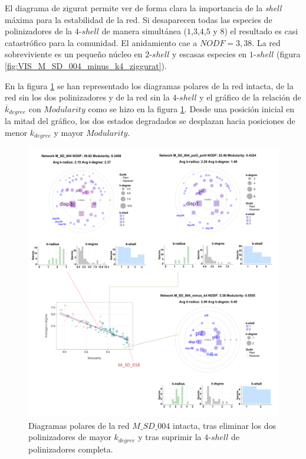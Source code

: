 El diagrama de zigurat permite ver de forma clara la importancia de la \textit{shell} máxima para la estabilidad de la red. Si desaparecen todas las especies de polinizadores de la $4$-$shell$ de manera simultánea ($1$,$3$,$4$,$5$ y $8$) el resultado es casi catastrófico para la comunidad. El anidamiento cae a $NODF = 3,38$. La red sobreviviente es un pequeño núcleo en $2$-$shell$ y escasas especies en $1$-$shell$ (figura \ref{fig:VIS_M_SD_004_minus_k4_ziggurat}).

En la figura \ref{fig:VIS_Modvskdegree3-sd04} se han representado los diagramas polares de la red intacta, de la red sin los dos polinizadores y de la red sin la $4$-$shell$ y el gráfico de la relación de $\overline k_{degree}$ con $Modularity$ como se hizo en la figura \ref{fig:VIS_Modvskdegree3-sd04}. Desde una posición inicial en la mitad del gráfico, los dos estados degradados se desplazan hacia posiciones de menor $k_{degree}$ y mayor $Modularity$.

\begin{figure}[h!]
\centering
\includegraphics[scale=0.23]{Figures/VIS_Modvskdegree3-sd04.pdf}
\caption {Diagramas polares de la red $M\_SD\_004$ intacta, tras eliminar los dos polinizadores de mayor $k_{degree}$ y tras suprimir la $4$-$shell$ de polinizadores completa.} 
\label{fig:VIS_Modvskdegree3-sd04}
\end{figure}
 
